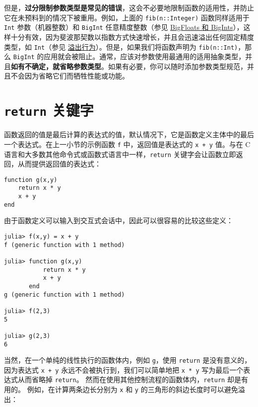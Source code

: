 但是，\textbf{过分限制参数类型是常见的错误}，这会不必要地限制函数的适用性，并防止它在未预料到的情况下被重用。例如，上面的 \texttt{fib(n::Integer)} 函数同样适用于 \texttt{Int} 参数（机器整数）和 \texttt{BigInt} 任意精度整数（参见 \hyperlink{18371658222475313580}{BigFloats 和 BigInts}），这样十分有效，因为斐波那契数以指数方式快速增长，并且会迅速溢出任何固定精度类型，如 \texttt{Int}（参见 \hyperlink{10689991880086615284}{溢出行为}）。但是，如果我们将函数声明为 \texttt{fib(n::Int)}，那么 \texttt{BigInt} 的应用就会被阻止。通常，应该对参数使用最通用的适用抽象类型，并且\textbf{如有不确定，就省略参数类型}。如果有必要，你可以随时添加参数类型规范，并且不会因为省略它们而牺牲性能或功能。



\hypertarget{8101712267958021215}{}


\section{\texttt{return} 关键字}



函数返回的值是最后计算的表达式的值，默认情况下，它是函数定义主体中的最后一个表达式。在上一小节的示例函数 \texttt{f} 中，返回值是表达式的 \texttt{x + y} 值。与在 C 语言和大多数其他命令式或函数式语言中一样，\texttt{return} 关键字会让函数立即返回，从而提供返回值的表达式：




\begin{verbatim}
function g(x,y)
    return x * y
    x + y
end
\end{verbatim}



由于函数定义可以输入到交互式会话中，因此可以很容易的比较这些定义：




\begin{verbatim}
julia> f(x,y) = x + y
f (generic function with 1 method)

julia> function g(x,y)
           return x * y
           x + y
       end
g (generic function with 1 method)

julia> f(2,3)
5

julia> g(2,3)
6
\end{verbatim}



当然，在一个单纯的线性执行的函数体内，例如 \texttt{g}，使用 \texttt{return} 是没有意义的，因为表达式 \texttt{x + y} 永远不会被执行到，我们可以简单地把 \texttt{x * y} 写为最后一个表达式从而省略掉 \texttt{return}。 然而在使用其他控制流程的函数体内，\texttt{return} 却是有用的。 例如，在计算两条边长分别为 \texttt{x} 和 \texttt{y} 的三角形的斜边长度时可以避免溢出：




